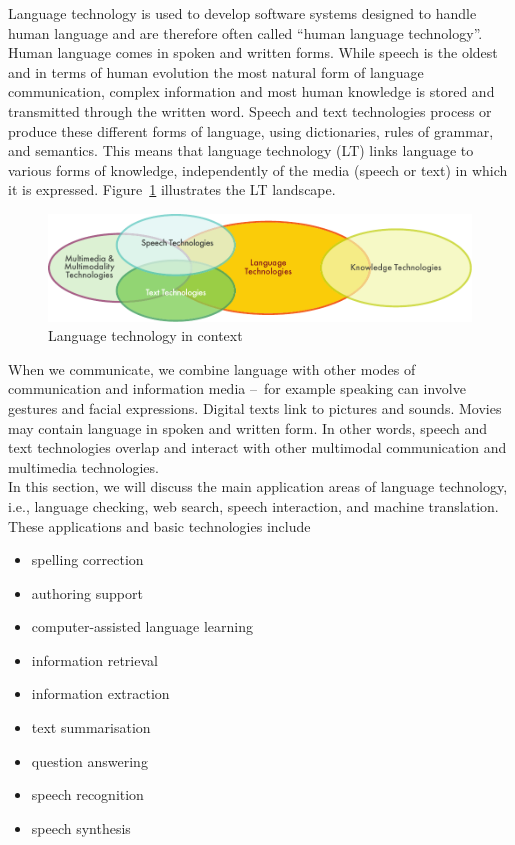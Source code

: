 \begin{multicols}{2}

Language technology is used to develop software systems designed to handle human language and are therefore often called “human language technology”. Human language comes in spoken and written forms. While speech is the oldest and in terms of human evolution the most natural form of language communication, complex information and most human knowledge is stored and transmitted through the written word. Speech and text technologies process or produce these different forms of language, using dictionaries, rules of grammar, and semantics. This means that language technology (LT) links language to various forms of knowledge, independently of the media (speech or text) in which it is expressed. Figure~\ref{fig:ltincontext_en} illustrates the LT landscape.

\begin{figure}[htb]
  \center
  \includegraphics[width=\textwidth]{../_media/english/language_technologies}
  \caption{Language technology in context}
  \label{fig:ltincontext_en}
\end{figure}

When we communicate, we combine language with other modes of communication and information media --~for example speaking can involve gestures and facial expressions. Digital texts link to pictures and sounds. Movies may contain language in spoken and written form. In other words, speech and text technologies overlap and interact with other multimodal communication and multimedia technologies.\\ 
In this section, we will discuss the main application areas of language technology, i.e., language checking, web search, speech interaction, and machine translation. These applications and basic technologies include 

\begin{itemize}
\item spelling correction
\item authoring support
\item computer-assisted language learning
\item information retrieval 
\item information extraction
\item text summarisation
\item question answering
\item speech recognition 
\item speech synthesis 
\end{itemize}


\end{multicols}

